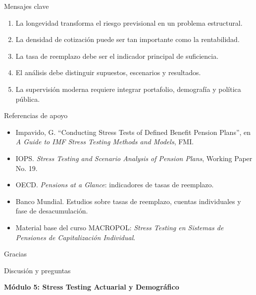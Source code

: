 \documentclass[aspectratio=169,11pt]{beamer}
\begin{document}
\begin{frame}{Mensajes clave}
\begin{enumerate}
  \item La longevidad transforma el riesgo previsional en un problema estructural.
  \item La densidad de cotización puede ser tan importante como la rentabilidad.
  \item La tasa de reemplazo debe ser el indicador principal de suficiencia.
  \item El análisis debe distinguir supuestos, escenarios y resultados.
  \item La supervisión moderna requiere integrar portafolio, demografía y política pública.
\end{enumerate}
\end{frame}

\begin{frame}{Referencias de apoyo}
\small
\begin{itemize}
  \item Impavido, G. ``Conducting Stress Tests of Defined Benefit Pension Plans'', en \textit{A Guide to IMF Stress Testing Methods and Models}, FMI.
  \item IOPS. \textit{Stress Testing and Scenario Analysis of Pension Plans}, Working Paper No. 19.
  \item OECD. \textit{Pensions at a Glance}: indicadores de tasas de reemplazo.
  \item Banco Mundial. Estudios sobre tasas de reemplazo, cuentas individuales y fase de desacumulación.
  \item Material base del curso MACROPOL: \textit{Stress Testing en Sistemas de Pensiones de Capitalización Individual}.
\end{itemize}
\end{frame}

\begin{frame}
\begin{center}
{\Huge Gracias}

\vspace{0.5cm}

{\Large Discusión y preguntas}

\vspace{0.5cm}

\textbf{Módulo 5: Stress Testing Actuarial y Demográfico}
\end{center}
\end{frame}
\end{document}
